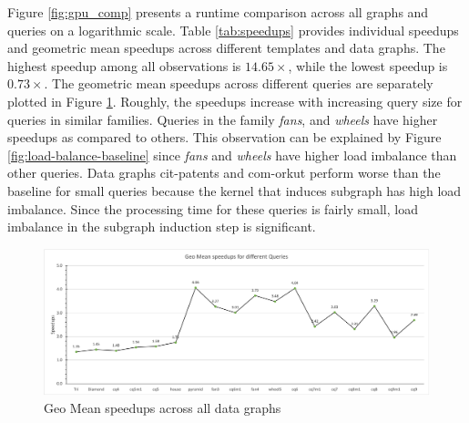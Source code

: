 


Figure \ref{fig:gpu_comp} presents a runtime comparison across all graphs and queries on a logarithmic scale.
Table \ref{tab:speedups} provides individual speedups and geometric mean speedups across different templates and data graphs.
The highest speedup among all observations is $14.65\times$, while the lowest speedup is $0.73\times$.
The geometric mean speedups across different queries are separately plotted in Figure \ref{fig:query-speedups}.
Roughly, the speedups increase with increasing query size for queries in similar families.
Queries in the family \textit{fans}, and \textit{wheels} have higher speedups as compared to others.
This observation can be explained by Figure \ref{fig:load-balance-baseline} since \textit{fans} and \textit{wheels} have higher load imbalance than other queries.
Data graphs cit-patents and com-orkut perform worse than the baseline for small queries because the kernel that induces subgraph has high load imbalance.
Since the processing time for these queries is fairly small, load imbalance in the subgraph induction step is significant.

\begin{figure}
    \includegraphics[width=\textwidth]{fig/Results/query-speedups.png}
    \caption{Geo Mean speedups across all data graphs}
    \label{fig:query-speedups}
\end{figure}
